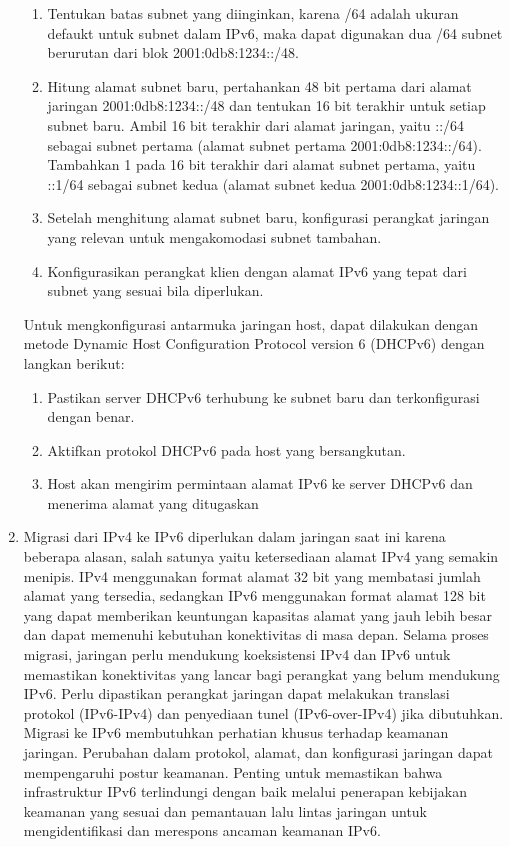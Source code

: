 \begin{enumerate}
    \begin{enumerate}
        \item Tentukan batas subnet yang diinginkan, karena /64 adalah ukuran defaukt untuk subnet dalam IPv6, maka dapat digunakan dua /64 subnet berurutan dari blok 2001:0db8:1234::/48.
        \item Hitung alamat subnet baru, pertahankan 48 bit pertama dari alamat jaringan 2001:0db8:1234::/48 dan tentukan 16 bit terakhir untuk setiap subnet baru. Ambil 16 bit terakhir dari alamat jaringan, yaitu ::/64 sebagai subnet pertama (alamat subnet pertama 2001:0db8:1234::/64). Tambahkan 1 pada 16 bit terakhir dari alamat subnet pertama, yaitu ::1/64 sebagai subnet kedua (alamat subnet kedua 2001:0db8:1234::1/64).
        \item Setelah menghitung alamat subnet baru, konfigurasi perangkat jaringan yang relevan untuk mengakomodasi subnet tambahan.
        \item Konfigurasikan perangkat klien dengan alamat IPv6 yang tepat dari subnet yang sesuai bila diperlukan.
        
    \end{enumerate}

    Untuk mengkonfigurasi antarmuka jaringan host, dapat dilakukan dengan metode Dynamic Host Configuration Protocol version 6 (DHCPv6) dengan langkan berikut:

    \begin{enumerate}
        \item Pastikan server DHCPv6 terhubung ke subnet baru dan terkonfigurasi dengan benar.
        \item Aktifkan protokol DHCPv6 pada host yang bersangkutan.
        \item Host akan mengirim permintaan alamat IPv6 ke server DHCPv6 dan menerima alamat yang ditugaskan
    \end{enumerate}
    
    \item Migrasi dari IPv4 ke IPv6 diperlukan dalam jaringan saat ini karena beberapa alasan, salah satunya yaitu ketersediaan alamat IPv4 yang semakin menipis. IPv4 menggunakan format alamat 32 bit yang membatasi jumlah alamat yang tersedia, sedangkan IPv6 menggunakan format alamat 128 bit yang dapat memberikan keuntungan kapasitas alamat yang jauh lebih besar dan dapat memenuhi kebutuhan konektivitas di masa depan. Selama proses migrasi, jaringan perlu mendukung koeksistensi IPv4 dan IPv6 untuk memastikan konektivitas yang lancar bagi perangkat yang belum mendukung IPv6. Perlu dipastikan perangkat jaringan dapat melakukan translasi protokol (IPv6-IPv4) dan penyediaan tunel (IPv6-over-IPv4) jika dibutuhkan. Migrasi ke IPv6 membutuhkan perhatian khusus terhadap keamanan jaringan. Perubahan dalam protokol, alamat, dan konfigurasi jaringan dapat mempengaruhi postur keamanan. Penting untuk memastikan bahwa infrastruktur IPv6 terlindungi dengan baik melalui penerapan kebijakan keamanan yang sesuai dan pemantauan lalu lintas jaringan untuk mengidentifikasi dan merespons ancaman keamanan IPv6.
    
\end{enumerate}